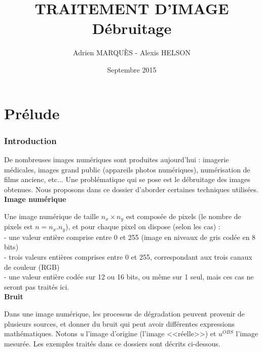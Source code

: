\documentclass{article}
\title{TRAITEMENT D'IMAGE\\Débruitage}
\author{Adrien MARQUÈS - Alexis HELSON }
\date{Septembre 2015}
\begin{document}
	\maketitle
	
	\part*{Prélude}
		
		\section{Introduction}
			De nombreuses images numériques sont produites aujourd'hui : imagerie médicales, images grand public (appareils photos numériques), numérisation de films ancienc, etc... Une problématique qui se pose est le débruitage des images obtenues. Nous proposons dans ce dossier d'aborder certaines techniques utilisées.\\
			\textbf{Image numérique}\par
			Une image numérique de taille \begin{math}n_{x} \times n_{y}\end{math} est composée de pixels (le nombre de pixels est \begin{math}n = n_{x}.n_{y}\end{math}), et pour chaque pixel on dispose (selon les cas) :\\
		 - une valeur entière comprise entre 0 et 255 (image en niveaux de gris codée en 8 bits)\\
		 - trois valeurs entières comprises entre 0 et 255, correspondant aux trois canaux de couleur (RGB)\\
		 - une valeur entière codée sur 12 ou 16 bits, ou même sur 1 seul, mais ces cas ne seront pas traités ici.\\
			\textbf{Bruit}\par
			Dans une image numérique, les processus de dégradation peuvent provenir de plusieurs sources, et donner du bruit qui peut avoir différentes expressions mathématiques. Notons \emph{u} l'image d'origine (l'image <<réelle>>) et \begin{math}u^{OBS}\end{math} l'image mesurée. Les exemples traités dans ce dossiers sont décrits ci-dessous.\par
			\\
\end{document}
